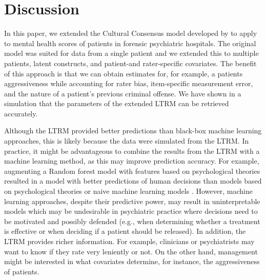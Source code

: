 \documentclass[a4paper,usenames,dvipsnames]{article}
\newenvironment{revision}{\color{teal}}{\color{black}}
\begin{document}
\section*{Discussion}

In this paper, we extended the Cultural Consensus model developed by  to apply to mental health scores of patients in forensic psychiatric hospitals. The original model was suited for data from a single patient and we extended this to multiple patients, latent constructs, and patient-and rater-specific covariates. The benefit of this approach is that we can obtain estimates for, for example, a patients aggressiveness while accounting for rater bias, item-specific measurement error, and the nature of a patient's previous criminal offense. We have shown in a simulation that the parameters of the extended LTRM can be retrieved accurately.

Although the LTRM provided better predictions than black-box machine learning approaches, this is likely because the data were simulated from the LTRM. 
\begin{revision}%
In practice, it might be advantageous to combine the results from the LTRM with a machine learning method, as this may improve prediction accuracy. 
For example, augmenting a Random forest model with features based on psychological theories resulted in a model with better predictions of human decisions than models based on psychological theories or naive machine learning models \cite{plonsky2019predicting, plonsky2017psychological}.%
\end{revision}
However, machine learning approaches, despite their predictive power, may result in uninterpretable models which may be undesirable in psychiatric practice where decisions need to be motivated and possibly defended (e.g., when determining whether a treatment is effective or when deciding if a patient should be released). \begin{revision}In addition, the LTRM provides richer information. For example, clinicians or psychiatrists may want to know if they rate very leniently or not. On the other hand, management might be interested in what covariates determine, for instance, the aggressiveness of patients.\end{revision}
\end{document}
